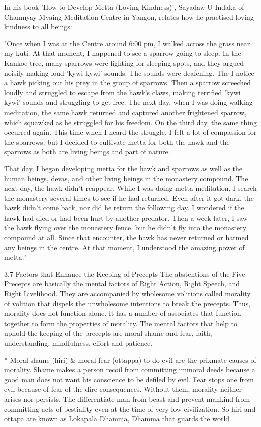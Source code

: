 In his book 'How to Develop Metta (Loving-Kindness)', Sayadaw U Indaka of Chanmyay Myaing Meditation Centre in Yangon, relates how he practised loving-kindness to all beings:

"Once when I was at the Centre around 6:00 pm, I walked across the grass near my kuti. At that moment, I happened to see a sparrow going to sleep. In the Kankoe tree, many sparrows were fighting for sleeping spots, and they argued noisily making loud 'kywi kywi' sounds. The sounds were deafening. The I notice a hawk picking out his prey in the group of sparrows. Then a sparrow screeched loudly and struggled to escape from the hawk's claws, making terrified 'kywi kywi' sounds and struggling to get free. The next day, when I was doing walking meditation, the same hawk returned and captured another frightened sparrow, which squawked as he struggled for his freedom. On the third day, the same thing occurred again. This time when I heard the struggle, I felt a lot of compassion for the sparrows, but I decided to cultivate metta for both the hawk and the sparrows as both are living beings and part of nature.

That day, I began developing metta for the hawk and sparrows as well as the human beings, devas, and other living beings in the monastery compound. The next day, the hawk didn't reappear. While I was doing metta meditation, I search the monastery several times to see if he had returned. Even after it got dark, the hawk didn't come back, nor did he return the following day. I wondered if the hawk had died or had been hurt by another predator. Then a week later, I saw the hawk flying over the monastery fence, but he didn't fly into the monastery compound at all. Since that encounter, the hawk has never returned or harmed any beings in the centre. At that moment, I understood the amazing power of metta."

3.7 Factors that Enhance the Keeping of Precepts
The abstentions of the Five Precepts are basically the mental factors of Right Action, Right Speech, and Right Livelihood. They are accompanied by wholesome volitions called morality of volition that dispels the unwholesome intentions to break the precepts. Thus, morality does not function alone. It has a number of associates that function together to form the properties of morality. The mental factors that help to uphold the keeping of the precepts are moral shame and fear, faith, understanding, mindfulness, effort and patience.

* Moral shame (hiri) & moral fear (ottappa) to do evil are the prixmate causes of morality. Shame makes a person recoil from committing immoral deeds because a good man does not want his conscience to be defiled by evil. Fear stops one from evil because of fear of the dire consequences. Without them, morality neither arises nor persists. The differentiate man from beast and prevent mankind from committing acts of bestiality even at the time of very low civilization. So hiri and ottapa are known as Lokapala Dhamma, Dhamma that guards the world.

